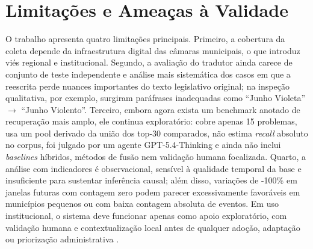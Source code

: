 \section{Limitações e Ameaças à Validade}
\label{sec:limitacoes}

O trabalho apresenta quatro limitações principais. Primeiro, a cobertura da coleta depende da infraestrutura digital das câmaras municipais, o que introduz viés regional e institucional. Segundo, a avaliação do tradutor ainda carece de conjunto de teste independente e análise mais sistemática dos casos em que a reescrita perde nuances importantes do texto legislativo original; na inspeção qualitativa, por exemplo, surgiram paráfrases inadequadas como ``Junho Violeta'' $\rightarrow$ ``Junho Violento''. Terceiro, embora agora exista um benchmark anotado de recuperação mais amplo, ele continua exploratório: cobre apenas 15 problemas, usa um pool derivado da união dos top-30 comparados, não estima \textit{recall} absoluto no corpus, foi julgado por um agente GPT-5.4-Thinking e ainda não inclui \textit{baselines} híbridos, métodos de fusão nem validação humana focalizada. Quarto, a análise com indicadores é observacional, sensível à qualidade temporal da base e insuficiente para sustentar inferência causal; além disso, variações de -100\% em janelas futuras com contagem zero podem parecer excessivamente favoráveis em municípios pequenos ou com baixa contagem absoluta de eventos. Em uso institucional, o sistema deve funcionar apenas como apoio exploratório, com validação humana e contextualização local antes de qualquer adoção, adaptação ou priorização administrativa \cite{alon_barkat_busuioc_2023}.
